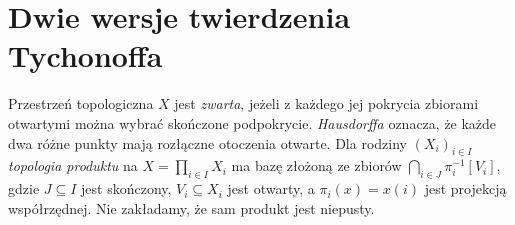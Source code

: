 \section{Dwie wersje twierdzenia Tychonoffa}
\label{sec:weak-choice-tychonoff}
\begin{definicja}
\label{def:tychonoff-topology}
Przestrzeń topologiczna $X$ jest \emph{zwarta}, jeżeli
z każdego jej pokrycia zbiorami otwartymi można wybrać
skończone podpokrycie. \emph{Hausdorffa} oznacza, że
każde dwa różne punkty mają rozłączne otoczenia otwarte.
Dla rodziny $(X_i)_{i\in I}$ \emph{topologia produktu}
na $X=\prod_{i\in I}X_i$ ma bazę złożoną ze zbiorów
$\bigcap_{i\in J}\pi_i^{-1}[V_i]$, gdzie
$J\subseteq I$ jest skończony, $V_i\subseteq X_i$ jest
otwarty, a $\pi_i(x)=x(i)$ jest projekcją współrzędnej.
Nie zakładamy, że sam produkt jest niepusty.
\end{definicja}

